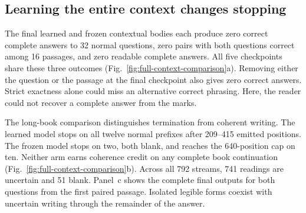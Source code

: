 \subsection*{Learning the entire context changes stopping}
The final learned and frozen contextual bodies each produce zero correct
complete answers to 32 normal questions, zero pairs with both questions correct
among 16 passages, and zero readable complete answers. All five checkpoints
share these three outcomes (Fig.~\ref{fig:full-context-comparison}a).
Removing either the question or the passage at the final checkpoint also gives
zero correct answers. Strict exactness alone could miss an alternative correct
phrasing. Here, the reader could not recover a complete answer from the marks.

The long-book comparison distinguishes termination from coherent writing.
The learned model stops on all twelve normal prefixes after 209--415 emitted
positions. The frozen model stops on two, both blank, and reaches the 640-position
cap on ten. Neither arm earns coherence credit on any complete book continuation
(Fig.~\ref{fig:full-context-comparison}b). Across all 792 streams, 741 readings
are uncertain and 51 blank. Panel~c shows the complete final outputs for both
questions from the first paired passage. Isolated legible forms coexist with
uncertain writing through the remainder of the answer.
